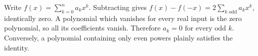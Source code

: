 Write $f(x)=\sum_{k=0}^n a_kx^k$. Subtracting gives $f(x)-f(-x)=2\sum_{k\text{ odd}}a_kx^k$, identically zero. A polynomial which vanishes for every real input is the zero polynomial, so all its coefficients vanish. Therefore $\boxed{a_k=0\text{ for every odd }k}$. Conversely, a polynomial containing only even powers plainly satisfies the identity.

